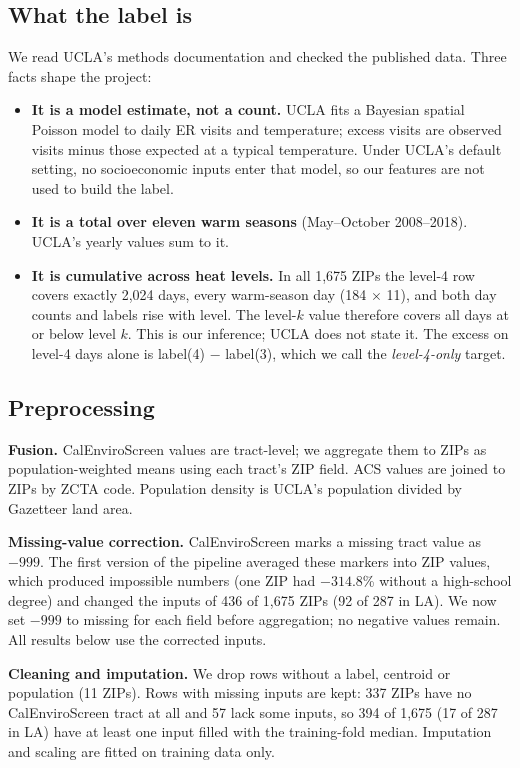 \documentclass[10pt]{article}
\begin{document}
\subsection{What the label is}
We read UCLA's methods documentation \cite{ucla2025} and checked the published data. Three facts shape the project:
\begin{itemize}
\item \textbf{It is a model estimate, not a count.} UCLA fits a Bayesian spatial Poisson model to daily ER visits and temperature; excess visits are observed visits minus those expected at a typical temperature. Under UCLA's default setting, no socioeconomic inputs enter that model, so our features are not used to build the label.
\item \textbf{It is a total over eleven warm seasons} (May--October 2008--2018). UCLA's yearly values sum to it.
\item \textbf{It is cumulative across heat levels.} In all 1,675 ZIPs the level-4 row covers exactly 2,024 days, every warm-season day (184 $\times$ 11), and both day counts and labels rise with level. The level-$k$ value therefore covers all days at or below level $k$. This is our inference; UCLA does not state it. The excess on level-4 days alone is label(4) $-$ label(3), which we call the \emph{level-4-only} target.
\end{itemize}

\subsection{Preprocessing}
\textbf{Fusion.} CalEnviroScreen values are tract-level; we aggregate them to ZIPs as population-weighted means using each tract's ZIP field. ACS values are joined to ZIPs by ZCTA code. Population density is UCLA's population divided by Gazetteer land area.

\textbf{Missing-value correction.} CalEnviroScreen marks a missing tract value as $-999$. The first version of the pipeline averaged these markers into ZIP values, which produced impossible numbers (one ZIP had $-314.8$\% without a high-school degree) and changed the inputs of 436 of 1,675 ZIPs (92 of 287 in LA). We now set $-999$ to missing for each field before aggregation; no negative values remain. All results below use the corrected inputs.

\textbf{Cleaning and imputation.} We drop rows without a label, centroid or population (11 ZIPs). Rows with missing inputs are kept: 337 ZIPs have no CalEnviroScreen tract at all and 57 lack some inputs, so 394 of 1,675 (17 of 287 in LA) have at least one input filled with the training-fold median. Imputation and scaling are fitted on training data only.
\end{document}
